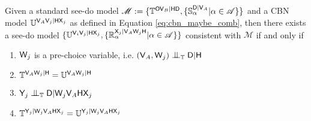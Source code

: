 \begin{theorem}\label{th:seedo_rep}
Given a standard see-do model $\mathscr{M}:=\{\mathbb{T}^{\mathsf{O}\mathsf{V}_B|\mathsf{HD}},\{\mathbb{S}_\alpha^{\mathsf{D}|\mathsf{V}_A}|\alpha\in \mathscr{A}\}\}$ and a CBN model $\mathbb{U}^{\mathsf{V}_A\mathsf{V}_j|\mathsf{HX}_j}$ as defined in Equation \ref{eq:cbn_maybe_comb}, then there exists a see-do model $\{\mathbb{U}^{\mathsf{V}_i\mathsf{V}_j|\mathsf{HX}_j},\{\mathbb{R}_\alpha^{\mathsf{X}_j|\mathsf{V}_A\mathsf{W}_j\mathsf{H}}|\alpha\in \mathscr{A}\}\}$ consistent with $\mathscr{M}$ if and only if
\begin{enumerate}
    \item $\mathsf{W}_j$ is a pre-choice variable, i.e. $(\RV{V}_A,\RV{W}_j)\CI_{\model{T}} \RV{D}|\RV{H}$
    \item $\mathbb{T}^{\mathsf{V}_A\mathsf{W}_j|\mathsf{H}} = \mathbb{U}^{\mathsf{V}_A\mathsf{W}_j|\mathsf{H}}$
    \item $\RV{Y}_j\CI_{\model{T}}\RV{D}|\RV{W}_j\RV{V}_A\RV{HX}_j$
    \item $\mathbb{T}^{\mathsf{Y}_j|\mathsf{W}_j\mathsf{V}_A\mathsf{HX}_j} = \mathbb{U}^{\mathsf{Y}_j|\mathsf{W}_j\mathsf{V}_A\mathsf{HX}_j}$
\end{enumerate}
\end{theorem}

